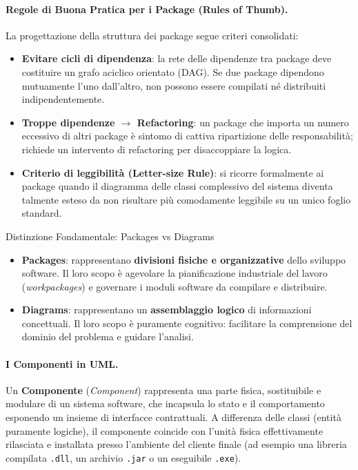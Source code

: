 \documentclass[12pt]{extarticle}
\begin{document}
\paragraph{Regole di Buona Pratica per i Package (Rules of Thumb).}
La progettazione della struttura dei package segue criteri consolidati:
\begin{itemize}
    \item \textbf{Evitare cicli di dipendenza}: la rete delle dipendenze tra package deve costituire un grafo aciclico orientato (DAG). Se due package dipendono mutuamente l'uno dall'altro, non possono essere compilati né distribuiti indipendentemente.
    \item \textbf{Troppe dipendenze $\to$ Refactoring}: un package che importa un numero eccessivo di altri package è sintomo di cattiva ripartizione delle responsabilità; richiede un intervento di refactoring per disaccoppiare la logica.
    \item \textbf{Criterio di leggibilità (Letter-size Rule)}: si ricorre formalmente ai package quando il diagramma delle classi complessivo del sistema diventa talmente esteso da non risultare più comodamente leggibile su un unico foglio standard.
\end{itemize}

\begin{cbox}{Distinzione Fondamentale: Packages vs Diagrams}
\begin{itemize}
    \item \textbf{Packages}: rappresentano \textbf{divisioni fisiche e organizzative} dello sviluppo software. Il loro scopo è agevolare la pianificazione industriale del lavoro (\textit{workpackages}) e governare i moduli software da compilare e distribuire.
    \item \textbf{Diagrams}: rappresentano un \textbf{assemblaggio logico} di informazioni concettuali. Il loro scopo è puramente cognitivo: facilitare la comprensione del dominio del problema e guidare l'analisi.
\end{itemize}
\end{cbox}

\paragraph{I Componenti in UML.}
Un \textbf{Componente} (\textit{Component}) rappresenta una parte fisica, sostituibile e modulare di un sistema software, che incapsula lo stato e il comportamento esponendo un insieme di interfacce contrattuali. A differenza delle classi (entità puramente logiche), il componente coincide con l'unità fisica effettivamente rilasciata e installata presso l'ambiente del cliente finale (ad esempio una libreria compilata \texttt{.dll}, un archivio \texttt{.jar} o un eseguibile \texttt{.exe}).
\end{document}
